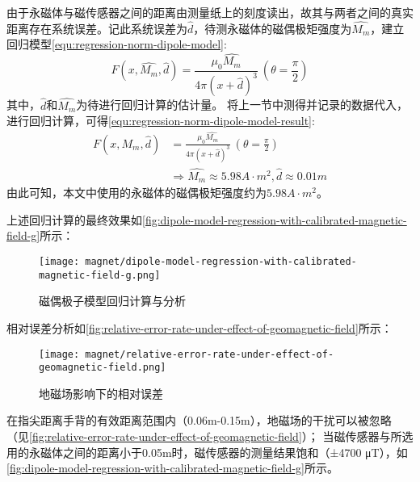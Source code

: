 由于永磁体与磁传感器之间的距离由测量纸上的刻度读出，故其与两者之间的真实距离存在系统误差。记此系统误差为$\widehat{d}$，待测永磁体的磁偶极矩强度为$\widehat{M_m}$，建立回归模型\autoref{equ:regression-norm-dipole-model}:
\begin{equation}
    \label{equ:regression-norm-dipole-model}
    F(x, \widehat{M_m}, \widehat{d}) = \frac{\mu_0 \widehat{M_m}}{4\pi(x+\widehat{d})^3} \ (\theta = \frac{\pi}{2})
\end{equation}
其中，$\widehat{d}$和$\widehat{M_m}$为待进行回归计算的估计量。
将上一节中测得并记录的数据代入，进行回归计算，可得\autoref{equ:regression-norm-dipole-model-result}:
\begin{equation}
    \label{equ:regression-norm-dipole-model-result}
    \begin{aligned}
    F(x, \widehat{M_m}, \widehat{d}) &= \frac{\mu_0 \widehat{M_m}}{4\pi(x+\widehat{d})^3} \ (\theta = \frac{\pi}{2}) \\
    & \Longrightarrow \widehat{M_m} \approx 5.98 A\cdot m^2, \widehat{d} \approx 0.01m
    \end{aligned}
\end{equation}
由此可知，本文中使用的永磁体的磁偶极矩强度约为$5.98 A\cdot m^2$。

上述回归计算的最终效果如\autoref{fig:dipole-model-regression-with-calibrated-magnetic-field-g}所示：

\begin{figure}[H]
    \centering
    \texttt{[image: magnet/dipole-model-regression-with-calibrated-magnetic-field-g.png]}
    \caption{\label{fig:dipole-model-regression-with-calibrated-magnetic-field-g}磁偶极子模型回归计算与分析}
\end{figure}

相对误差分析如\autoref{fig:relative-error-rate-under-effect-of-geomagnetic-field}所示：

\begin{figure}[H]
    \centering
    \texttt{[image: magnet/relative-error-rate-under-effect-of-geomagnetic-field.png]}
    \caption{\label{fig:relative-error-rate-under-effect-of-geomagnetic-field}地磁场影响下的相对误差}
\end{figure}

在指尖距离手背的有效距离范围内（0.06m-0.15m），地磁场的干扰可以被忽略（见\autoref{fig:relative-error-rate-under-effect-of-geomagnetic-field}）；
当磁传感器与所选用的永磁体之间的距离小于0.05m时，磁传感器的测量结果饱和（±4700 μT），如\autoref{fig:dipole-model-regression-with-calibrated-magnetic-field-g}所示。

